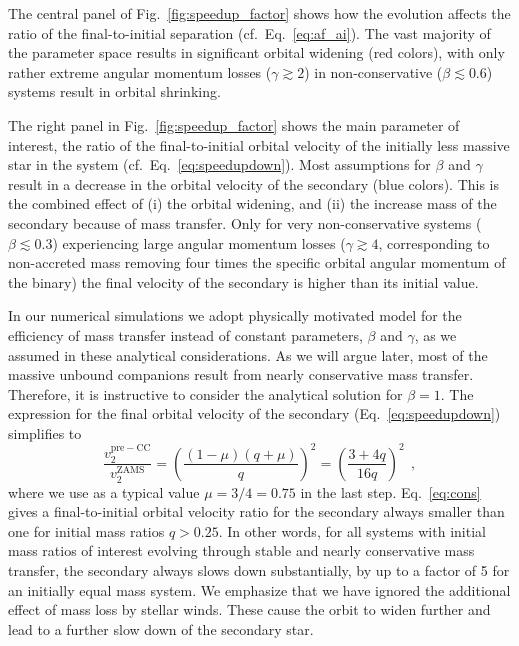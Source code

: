 \documentclass{aa}
\DeclareRobustCommand{\Eqref}[1]{Eq.~\ref{#1}}
\DeclareRobustCommand{\Figref}[1]{Fig.~\ref{#1}}
\begin{document}
 The central panel of \Figref{fig:speedup_factor} shows how the
 evolution affects the ratio of the final-to-initial separation (cf.~\Eqref{eq:af_ai}). The
 vast majority of the parameter space results in significant orbital
 widening (red colors), with only rather extreme angular momentum
 losses ($\gamma\gtrsim2$) in non-conservative
 ($\beta\lesssim0.6$) systems result in orbital shrinking.

 The right panel in \Figref{fig:speedup_factor} shows the main
 parameter of interest, the ratio of the final-to-initial orbital
 velocity of the initially less massive star in the system (cf.~\Eqref{eq:speedupdown}). Most
 assumptions for $\beta$ and $\gamma$ result in a decrease in the
 orbital velocity of the secondary (blue colors). This is the combined
 effect of (i) the orbital widening, and (ii) the increase mass of the secondary
 because of mass transfer. Only for very non-conservative systems
 ($\beta\lesssim0.3$) experiencing large
 angular momentum losses ($\gamma\gtrsim4$, corresponding to
 non-accreted mass removing four times the specific orbital angular
 momentum of the binary) the final velocity of the secondary is higher
 than its initial value. 

 In our numerical simulations we adopt physically motivated model for the
 efficiency of mass transfer instead of constant parameters, $\beta$
 and $\gamma$, as we assumed in these analytical considerations. As we
 will argue later, most of the massive unbound companions result from
 nearly conservative mass transfer. Therefore, it is instructive to
 consider the analytical solution for $\beta = 1$. The expression for the final orbital velocity of the secondary (\Eqref{eq:speedupdown}) simplifies to 
 \begin{equation}
   \label{eq:cons}
   \frac{v_2^\mathrm{pre-CC}}{v_2^\mathrm{ZAMS}} =
   \left(\frac{(1-\mu)(q+\mu)}{q}\right)^2 = \left(\frac{3+4q}{16
       q}\right)^2 \ \ ,
 \end{equation}
 where we use as a typical value $\mu=3/4=0.75$ in the last
 step. \Eqref{eq:cons} gives a final-to-initial orbital velocity ratio for the
 secondary always smaller than one for initial mass
 ratios $q>0.25$. In other words, for all systems with initial mass
 ratios of interest evolving through stable and nearly conservative
 mass transfer, the secondary always slows down
 substantially, by up to a factor of 5 for an initially equal mass
 system. We emphasize that we have ignored the additional effect of mass loss by
 stellar winds. %
 These cause the orbit to widen further and lead to a
 further slow down of the secondary star.
\end{document}
